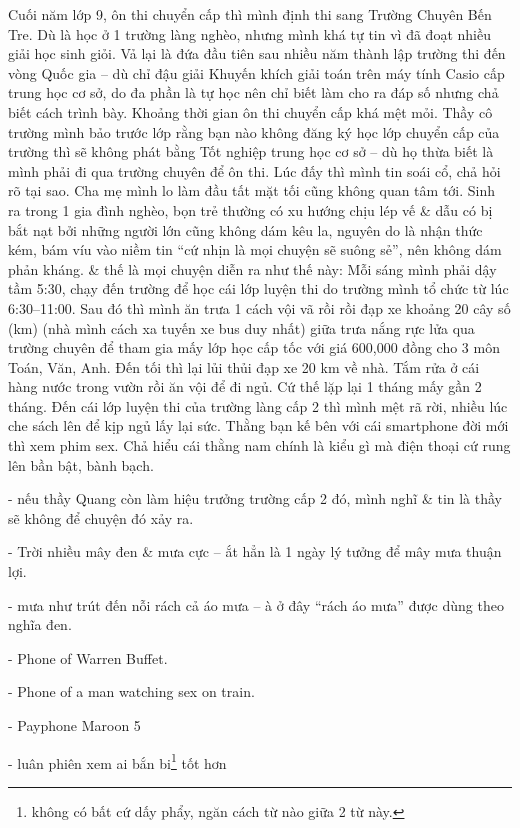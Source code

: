 \documentclass[12pt,twoside]{book}
\begin{document}
Cuối năm lớp 9, ôn thi chuyển cấp thì mình định thi sang Trường Chuyên Bến Tre. Dù là học ở 1 trường làng nghèo, nhưng mình khá tự tin vì đã đoạt nhiều giải học sinh giỏi. Vả lại là đứa đầu tiên sau nhiều năm thành lập trường thi đến vòng Quốc gia -- dù chỉ đậu giải Khuyến khích giải toán trên máy tính Casio cấp trung học cơ sở, do đa phần là tự học nên chỉ biết làm cho ra đáp số nhưng chả biết cách trình bày. Khoảng thời gian ôn thi chuyển cấp khá mệt mỏi. Thầy cô trường mình bảo trước lớp rằng bạn nào không đăng ký học lớp chuyển cấp của trường thì sẽ không phát bằng Tốt nghiệp trung học cơ sở -- dù họ thừa biết là mình phải đi qua trường chuyên để ôn thi. Lúc đấy thì mình tin soái cổ, chả hỏi rõ tại sao. Cha mẹ mình lo làm đầu tất mặt tối cũng không quan tâm tới. Sinh ra trong 1 gia đình nghèo, bọn trẻ thường có xu hướng chịu lép vế \& dẫu có bị bắt nạt bởi những người lớn cũng không dám kêu la, nguyên do là nhận thức kém, bám víu vào niềm tin ``cứ nhịn là mọi chuyện sẽ suông sẻ'', nên không dám phản kháng. \& thế là mọi chuyện diễn ra như thế này: Mỗi sáng mình phải dậy tầm 5:30, chạy đến trường để học cái lớp luyện thi do trường mình tổ chức từ lúc 6:30--11:00. Sau đó thì mình ăn trưa 1 cách vội vã rồi rồi đạp xe khoảng 20 cây số (km) (nhà mình cách xa tuyến xe bus duy nhất) giữa trưa nắng rực lửa qua trường chuyên để tham gia mấy lớp học cấp tốc với giá 600,000 đồng cho 3 môn Toán, Văn, Anh. Đến tối thì lại lủi thủi đạp xe 20 km về nhà. Tắm rửa ở cái hàng nước trong vườn rồi ăn vội để đi ngủ. Cứ thế lặp lại 1 tháng mấy gần 2 tháng. Đến cái lớp luyện thi của trường làng cấp 2 thì mình mệt rã rời, nhiều lúc che sách lên để kịp ngủ lấy lại sức. Thằng bạn kế bên với cái smartphone đời mới thì xem phim sex. Chả hiểu cái thằng nam chính là kiểu gì mà điện thoại cứ rung lên bần bật, bành bạch.

- nếu thầy Quang còn làm hiệu trưởng trường cấp 2 đó, mình nghĩ \& tin là thầy sẽ không để chuyện đó xảy ra.

- Trời nhiều mây đen \& mưa cực -- ắt hẳn là 1 ngày lý tưởng để mây mưa thuận lợi.

- mưa như trút đến nỗi rách cả áo mưa -- à ở đây ``rách áo mưa'' được dùng theo nghĩa đen.

- Phone of Warren Buffet.

- Phone of a man watching sex on train.

- Payphone Maroon 5

- luân phiên xem ai bắn bi\footnote{không có bất cứ dấy phẩy, ngăn cách từ nào giữa 2 từ này.} tốt hơn
\end{document}
